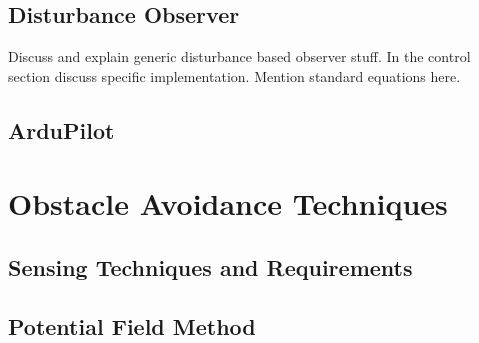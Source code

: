 	\subsection{Disturbance Observer}\label{SectionDisturbanceObserver}
	Discuss and explain generic disturbance based observer stuff. In the control section discuss specific implementation. Mention standard equations here. 
	
	\subsection{ArduPilot}
	
\section{Obstacle Avoidance Techniques}
	\subsection{Sensing Techniques and Requirements}
	\subsection{Potential Field Method}
	
